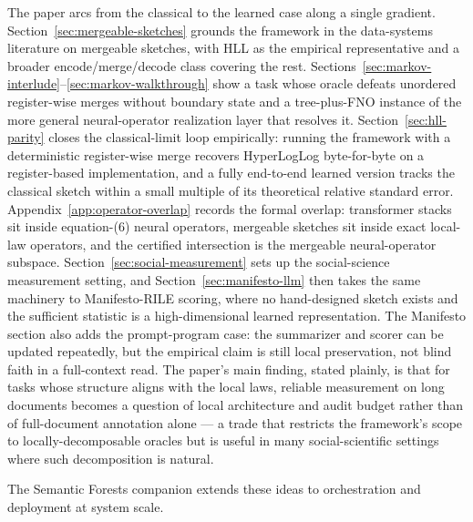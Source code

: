 The paper arcs from the classical to the learned case along a single
gradient. Section~\ref{sec:mergeable-sketches} grounds the framework in
the data-systems literature on mergeable sketches, with HLL as the
empirical representative and a broader encode/merge/decode class
covering the rest.
Sections~\ref{sec:markov-interlude}--\ref{sec:markov-walkthrough} show
a task whose oracle defeats unordered register-wise merges without
boundary state and a tree-plus-FNO
instance of the more general neural-operator realization layer that
resolves it. Section~\ref{sec:hll-parity} closes the
classical-limit loop empirically: running the framework with a
deterministic register-wise merge recovers HyperLogLog byte-for-byte on
a register-based implementation, and a fully end-to-end learned version
tracks the classical sketch within a small multiple of its theoretical
relative standard error. Appendix~\ref{app:operator-overlap} records the
formal overlap: transformer stacks sit inside equation-(6) neural
operators, mergeable sketches sit inside exact local-law operators, and
the certified intersection is the mergeable neural-operator subspace.
Section~\ref{sec:social-measurement} sets up the social-science
measurement setting, and Section~\ref{sec:manifesto-llm} then takes the
same machinery to Manifesto-RILE scoring, where no hand-designed sketch
exists and the sufficient statistic is a high-dimensional learned
representation. The Manifesto section also adds the prompt-program case: the
summarizer and scorer can be updated repeatedly, but the empirical claim
is still local preservation, not blind faith in a full-context read.
The paper's main finding, stated plainly, is that for
tasks whose structure aligns with the local laws, reliable measurement
on long documents becomes a question of local architecture and audit
budget rather than of full-document annotation alone --- a trade that restricts the framework's
scope to locally-decomposable oracles but is useful in many
social-scientific settings where such decomposition is natural.

The Semantic Forests companion extends these ideas to orchestration
and deployment at system scale.
